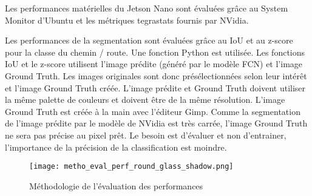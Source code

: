 \par Les performances matérielles du Jetson Nano sont évaluées grâce au System Monitor d’Ubuntu et les métriques tegrastats fournis par NVidia.
\par Les performances de la segmentation sont évaluées grâce au IoU et au z-score pour la classe du chemin / route. Une fonction Python est utilisée. Les fonctions IoU et le z-score utilisent l'image prédite (généré par le modèle FCN) et l'image Ground Truth. Les images originales sont donc présélectionnées selon leur intérêt et l'image Ground Truth créée. L'image prédite et Ground Truth doivent utiliser la même palette de couleurs et doivent être de la même résolution. 
L'image Ground Truth est créée à la main avec l'éditeur Gimp. Comme la segmentation de l'image prédite par le modèle de NVidia est très carrée, l'image Ground Truth ne sera pas précise au pixel prêt. Le besoin est d'évaluer et non d'entrainer, l'importance de la précision de la classification est moindre. 

\label{metho_eval}
\begin{figure}
    \centering
    \texttt{[image: metho\_eval\_perf\_round\_glass\_shadow.png]}
    \caption{Méthodologie de l'évaluation des performances}
    \label{fig:metho_eval}
\end{figure}
